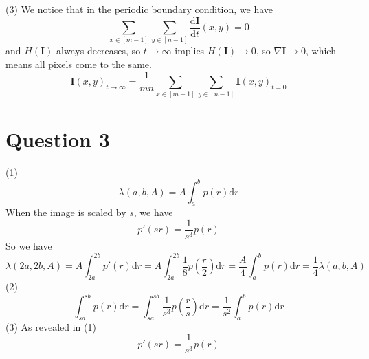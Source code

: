 \documentclass{article}
\begin{document}
(3) We notice that in the periodic boundary condition, we have
\begin{equation*}
    \sum_{x \in [m - 1]} \sum_{y \in [n - 1]} \frac{\mathrm{d} \mathbf{I}}{\mathrm{d} t}(x, y) = 0
\end{equation*}
and $H(\mathbf{I})$ always decreases, so $t \rightarrow \infty$ implies $H(\mathbf{I}) \rightarrow 0$, so $\nabla \mathbf{I} \rightarrow 0$, which means all pixels come to the same.
\begin{equation*}
    \mathbf{I}(x, y)_{t \rightarrow \infty} = \frac{1}{mn} \sum_{x \in [m - 1]} \sum_{y \in [n - 1]} \mathbf{I}(x, y)_{t = 0}
\end{equation*}
\clearpage
\section{Question 3}
(1)
\begin{equation*}
    \lambda(a, b, A) = A \int_a^b p(r)\mathrm{d}r
\end{equation*}
When the image is scaled by $s$, we have
\begin{equation*}
    p'(sr) = \frac{1}{s^3} p(r)
\end{equation*}
So we have
\begin{equation*}
    \lambda(2a, 2b, A) = A \int_{2a}^{2b} p'(r)\mathrm{d}r = A \int_{2a}^{2b} \frac{1}{8} p(\frac{r}{2})\mathrm{d}r = \frac{A}{4} \int_a^b p(r)\mathrm{d}r = \frac{1}{4} \lambda(a, b, A)
\end{equation*}
(2)
\begin{equation*}
    \int_{sa}^{sb} p(r)\mathrm{d}r = \int_{sa}^{sb} \frac{1}{s^3} p(\frac{r}{s})\mathrm{d}r = \frac{1}{s^2} \int_a^b p(r)\mathrm{d}r
\end{equation*}
(3) As revealed in (1)
\begin{equation*}
    p'(sr) = \frac{1}{s^3} p(r)
\end{equation*}
\clearpage
\end{document}
